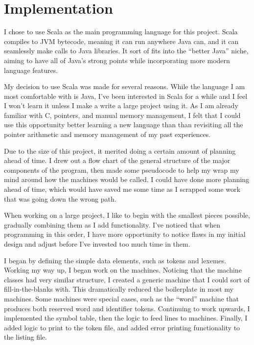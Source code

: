 \documentclass[paper=letter, fontsize=11pt, oneside, titlepage]{scrartcl}
\begin{document}
\section{Implementation}\label{impl}

I chose to use Scala as the main programming language for this project.  Scala compiles to JVM bytecode, meaning it can run anywhere Java can, and it can seamlessly make calls to Java libraries.  It sort of fits into the ``better Java'' niche, aiming to have all of Java's strong points while incorporating more modern language features.

My decision to use Scala was made for several reasons.  While the language I am most comfortable with is Java, I've been interested in Scala for a while and I feel I won't learn it unless I make a write a large project using it.  As I am already familiar with C, pointers, and manual memory management, I felt that I could use this opportunity better learning a new language than than revisiting all the pointer arithmetic and memory management of my past experiences.  

Due to the size of this project, it merited doing a certain amount of planning ahead of time.  I drew out a flow chart of the general structure of the major components of the program, then made some pseudocode to help my wrap my mind around how the machines would be called.  I could have done more planning ahead of time, which would have saved me some time as I scrapped some work that was going down the wrong path.

When working on a large project, I like to begin with the smallest pieces possible, gradually combining them as I add functionality.  I've noticed that when programming in this order, I have more opportunity to notice flaws in my initial design and adjust before I've invested too much time in them.

I began by defining the simple data elements, such as tokens and lexemes. Working my way up, I began work on the machines.  Noticing that the machine classes had very similar structure, I created a generic machine that I could sort of fill-in-the-blanks with.  This dramatically reduced the boilerplate in most my machines. Some machines were special cases, such as the ``word'' machine that produces both reserved word and identifier tokens.  Continuing to work upwards, I implemented the symbol table, then the logic to feed lines to machines.  Finally, I added logic to print to the token file, and added error printing functionality to the listing file.
\end{document}
